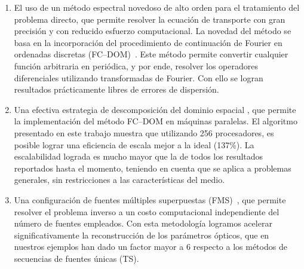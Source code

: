 \begin{enumerate}
\item El uso de un método espectral novedoso de alto orden
para el tratamiento del problema directo, que permite resolver la 
ecuación de transporte con gran precisión y con reducido esfuerzo 
computacional. La novedad del método se basa en la incorporación 
del procedimiento de continuación de Fourier 
en ordenadas discretas (FC--DOM)~\cite{Gaggioli2019}. 
Este método permite convertir cualquier función arbitraria en periódica, y 
por ende, resolver los operadores diferenciales utilizando transformadas 
de Fourier. Con ello se logran resultados prácticamente libres de 
errores de dispersión.

\item Una efectiva estrategia de descomposición del dominio espacial 
\cite{Gaggioli2022}, 
que permite la implementación del método FC--DOM en máquinas paralelas. 
El algoritmo presentado en este trabajo muestra que utilizando 
256 procesadores, es posible lograr una eficiencia de escala 
mejor a la ideal (137\%). 
La escalabilidad lograda es mucho mayor que la de todos los 
resultados reportados hasta el momento, teniendo en cuenta que 
se aplica a problemas generales, sin restricciones a las 
características del medio.

\item Una configuración de fuentes múltiples superpuestas (FMS)~\cite{Gaggioli2022}, 
que permite resolver el problema inverso a un costo computacional 
independiente del número de fuentes empleados. 
Con esta metodología logramos acelerar significativamente la reconstrucción 
de los parámetros ópticos, que en nuestros ejemplos han dado un factor mayor a 6 
respecto a los métodos de secuencias de fuentes únicas (TS).

\end{enumerate}

